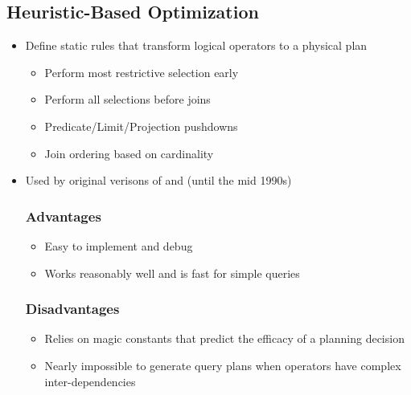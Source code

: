 \documentclass[11pt]{article}
\begin{document}
    \subsection*{Heuristic-Based Optimization~\cite{p409-youssefi}}
    \begin{itemize}
        \item Define static rules that transform logical operators to a physical plan
        \begin{itemize}
            \item Perform most restrictive selection early
            \item Perform all selections before joins
            \item Predicate/Limit/Projection pushdowns
            \item Join ordering based on cardinality
        \end{itemize}
        \item Used by original verisons of  and  (until the mid 1990s)

        \subsubsection*{Advantages}
        \begin{itemize}
            \item Easy to implement and debug
            \item Works reasonably well and is fast for simple queries
        \end{itemize}

        \subsubsection*{Disadvantages}
        \begin{itemize}
            \item Relies on magic constants that predict the efficacy of a planning decision
            \item Nearly impossible to generate query plans when operators have complex inter-dependencies
        \end{itemize}

    \end{itemize}
\end{document}

